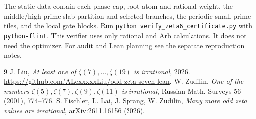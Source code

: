 \IfFileExists{TS1cmr.fd}{\documentclass[11pt]{article}}
\begin{document}
The static data contain each phase cap, root atom and rational
weight, the middle/high-prime slab partition and selected
branches, the periodic small-prime tiles, and the local gate
blocks. Run \texttt{python verify\_zeta6\_certificate.py}
with \texttt{python-flint}. This verifier uses only rational
and Arb calculations. It does not need the optimizer. For
audit and Lean planning see the separate reproduction notes.

\begin{thebibliography}{9}
 J. Liu, \emph{At least one of \(\zeta(7),\ldots,\zeta(19)\)
is irrational}, 2026. \url{https://github.com/ALexxxxxLiu/odd-zeta-seven-lean}.
 W. Zudilin, \emph{One of the numbers \(\zeta(5),\zeta(7),
\zeta(9),\zeta(11)\) is irrational}, Russian Math. Surveys 56 (2001), 774--776.
 S. Fischler, L. Lai, J. Sprang, W. Zudilin,
\emph{Many more odd zeta values are irrational}, arXiv:2611.16156 (2026).
\end{thebibliography}
\end{document}
